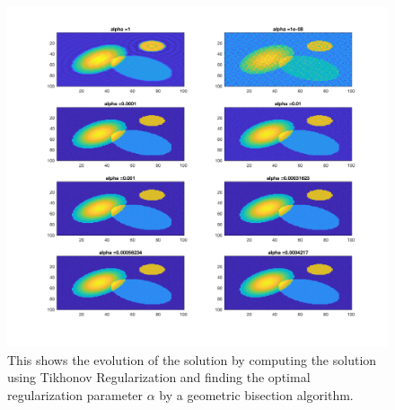 \documentclass{article}
\begin{document}
\begin{figure}[H]
\centerline{
\includegraphics[width = 20cm]{evolution.png}
}
\caption{\label{fig:Figure 5} This shows the evolution of the solution by computing the solution using Tikhonov Regularization and finding the optimal regularization parameter $\alpha$ by a geometric bisection algorithm.}
\end{figure}
\end{document}
